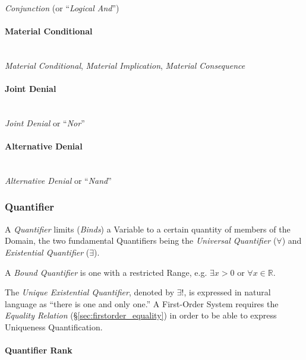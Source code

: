 \emph{Conjunction} (or ``\emph{Logical And}'')



\paragraph{Material Conditional}\label{sec:material_conditional}\hfill \\

\emph{Material Conditional}, \emph{Material Implication},
\emph{Material Consequence}



\paragraph{Joint Denial}\label{sec:joint_denial}\hfill \\

\emph{Joint Denial} or ``\emph{Nor}''



\paragraph{Alternative Denial}\label{sec:alternative_denial}\hfill \\

\emph{Alternative Denial} or ``\emph{Nand}''



\subsubsection{Quantifier}\label{sec:quantifier}

A \emph{Quantifier} limits (\emph{Binds}) a Variable to a certain
quantity of members of the Domain, the two fundamental Quantifiers
being the \emph{Universal Quantifier} ($\forall$) and
\emph{Existential Quantifier} ($\exists$).

A \emph{Bound Quantifier} is one with a restricted Range, e.g.
$\exists x > 0$ or $\forall x \in \mathbb{R}$.

The \emph{Unique Existential Quantifier}, denoted by $\exists !$, is
expressed in natural language as ``there is one and only one.'' A
First-Order System requires the \emph{Equality Relation}
(\S\ref{sec:firstorder_equality}) in order to be able to express
Uniqueness Quantification.



\paragraph{Quantifier Rank}\label{sec:quantifier_rank}\hfill \\

